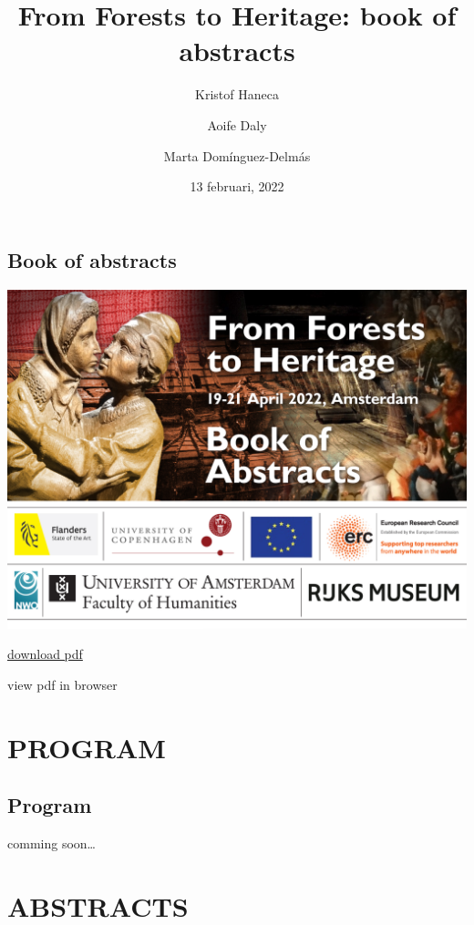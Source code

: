 \documentclass[
]{book}
\title{From Forests to Heritage: book of abstracts}
\author{Kristof Haneca \and Aoife Daly \and Marta Domínguez-Delmás}
\date{13 februari, 2022}
\begin{document}
\maketitle

{
\setcounter{tocdepth}{1}
\tableofcontents
}
\hypertarget{book-of-abstracts}{%
\chapter*{Book of abstracts}\label{book-of-abstracts}}

\href{https://event.forests2heritage.nl/}{\includegraphics[width=1\textwidth,height=\textheight]{bookofAbstracts header.jpg}}

\href{https://github.com/hanecakr/forests2heritage/raw/main/docs/ForHer22_BOOKofABSTRACTS}{download pdf}

view pdf in browser

\hypertarget{part-program}{%
\part*{PROGRAM}\label{part-program}}

\hypertarget{program}{%
\chapter*{Program}\label{program}}

comming soon\ldots{}

\hypertarget{part-abstracts}{%
\part*{ABSTRACTS}\label{part-abstracts}}
\end{document}
